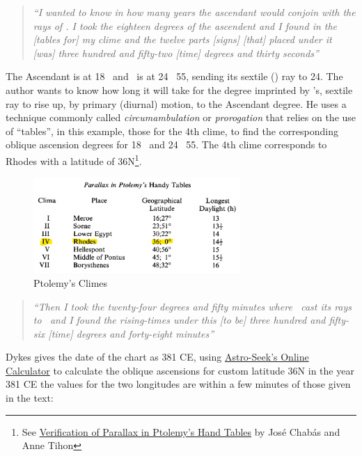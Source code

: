 \begin{quote}
\textsl{``I wanted to know in how many years the ascendant would conjoin with the rays of \Mars. I took the eighteen degrees of the ascendent and I found in the [tables for] my clime and the twelve parts [signs] [that] placed under it [was] three hundred and fifty-two [time] degrees and thirty seconds''}
\end{quote}

The Ascendant is at 18 \Pisces\, and \Mars\, is at 24 \Taurus\, 55, sending its sextile (\Sextile) ray to 24. The author wants to know how long it will take for the degree imprinted by \Mars's, sextile ray to rise up, by primary (diurnal) motion, to the Ascendant degree. He uses a technique commonly called \textsl{circumambulation} or \textsl{prorogation} that relies on the use of ``tables'', in this example, those for the 4th clime, to find the corresponding oblique ascension degrees for 18 \Pisces\, and 24 \Taurus\, 55. The 4th clime corresponds to Rhodes with a latitude of 36N\footnote{See \href{https://journals.sagepub.com/doi/10.1177/002182869302400105}{Verification of Parallax in Ptolemy's Hand Tables} by José Chabás and Anne Tihon }.

\begin{figure}[H]
\centering
\includegraphics[width=0.7\textwidth]{diagrams/Ptolemy-climes}
\vspace{-0.5em}
\caption{Ptolemy's Climes}
\end{figure}

\begin{quote}
\textsl{``Then  I took the twenty-four degrees and fifty minutes where \Mars\, cast its rays to \Pisces\, and I found the rising-times under this [to be] three hundred and fifty-six [time] degrees and forty-eight minutes''}
\end{quote}

Dykes gives the date of the chart as 381 CE, using \href{https://horoscopes.astro-seek.com/calculate-ascensional-rising-times/?latitude=100&narozeni_lat_custom_stupne=36&narozeni_lat_custom_minuty=0&narozeni_lat_custom_smer=0&narozeni_rok=381&aya=&oa=4&decimal=1}{Astro-Seek's Online Calculator} to calculate the oblique ascensions for custom latitude 36N in the year 381 CE the values for the two longitudes are within a few minutes of those given in the text:

